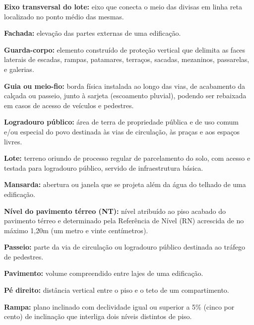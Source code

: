 \vspace{10pt}\noindent\textbf{Eixo transversal do lote:} eixo que conecta o meio das divisas em linha reta localizado no ponto médio das mesmas.

\vspace{10pt}\noindent\textbf{Fachada:} elevação das partes externas de uma edificação.

\vspace{10pt}\noindent\textbf{Guarda-corpo:} elemento construído de proteção vertical que delimita as faces laterais de escadas, rampas, patamares, terraços, sacadas, mezaninos, passarelas, e galerias.

\vspace{10pt}\noindent\textbf{Guia ou meio-fio:} borda física instalada ao longo das vias, de acabamento da calçada ou passeio, junto à sarjeta (escoamento pluvial), podendo ser rebaixada em casos de acesso de 
veículos e pedestres.

\vspace{10pt}\noindent\textbf{Logradouro público:} área de terra de propriedade pública e de uso comum e/ou especial  do povo destinada às vias de circulação, às praças e aos espaços livres.

\vspace{10pt}\noindent\textbf{Lote:} terreno oriundo de processo regular de parcelamento do solo, com acesso e  testada para logradouro público, servido de infraestrutura básica.

\vspace{10pt}\noindent\textbf{Mansarda:} abertura ou janela que se projeta além da água do telhado de uma  edificação.

\vspace{10pt}\noindent\textbf{Nível do pavimento térreo (NT):} nível atribuído ao piso acabado do pavimento térreo e  determinado pela Referência de Nível (RN) acrescida de no máximo 1,20m (um metro e vinte centímetros).

\vspace{10pt}\noindent\textbf{Passeio:} parte da via de circulação ou logradouro público destinada ao tráfego de pedestres.

\vspace{10pt}\noindent\textbf{Pavimento:} volume compreendido entre lajes de uma edificação.

\vspace{10pt}\noindent\textbf{Pé direito:} distância vertical entre o piso e o teto de um compartimento.

\vspace{10pt}\noindent\textbf{Rampa:} plano inclinado com declividade igual ou superior a 5\% (cinco por cento) de inclinação que interliga dois níveis distintos de piso.

